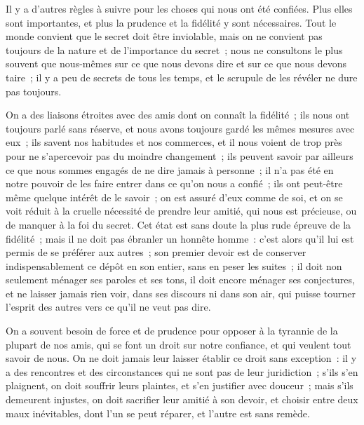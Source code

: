 \documentclass[french,twoside]{book} %
\begin{document}
Il y a d’autres règles à suivre pour les choses qui nous ont été confiées. Plus elles sont importantes, et plus la prudence et la fidélité y sont nécessaires. Tout le monde convient que le secret doit être inviolable, mais on ne convient pas toujours de la nature et de l’importance du secret ; nous ne consultons le plus souvent que nous-mêmes sur ce que nous devons dire et sur ce que nous devons taire ; il y a peu de secrets de tous les temps, et le scrupule de les révéler ne dure pas toujours.\par
On a des liaisons étroites avec des amis dont on connaît la fidélité ; ils nous ont toujours parlé sans réserve, et nous avons toujours gardé les mêmes mesures avec eux ; ils savent nos habitudes et nos commerces, et il nous voient de trop près pour ne s’apercevoir pas du moindre changement ; ils peuvent savoir par ailleurs ce que nous sommes engagés de ne dire jamais à personne ; il n’a pas été en notre pouvoir de les faire entrer dans ce qu’on nous a confié ; ils ont peut-être même quelque intérêt de le savoir ; on est assuré d’eux comme de soi, et on se voit réduit à la cruelle nécessité de prendre leur amitié, qui nous est précieuse, ou de manquer à la foi du secret. Cet état est sans doute la plus rude épreuve de la fidélité ; mais il ne doit pas ébranler un honnête homme : c’est alors qu’il lui est permis de se préférer aux autres ; son premier devoir est de conserver indispensablement ce dépôt en son entier, sans en peser les suites ; il doit non seulement ménager ses paroles et ses tons, il doit encore ménager ses conjectures, et ne laisser jamais rien voir, dans ses discours ni dans son air, qui puisse tourner l’esprit des autres vers ce qu’il ne veut pas dire.\par
On a souvent besoin de force et de prudence pour opposer à la tyrannie de la plupart de nos amis, qui se font un droit sur notre confiance, et qui veulent tout savoir de nous. On ne doit jamais leur laisser établir ce droit sans exception : il y a des rencontres et des circonstances qui ne sont pas de leur juridiction ; s’ils s’en plaignent, on doit souffrir leurs plaintes, et s’en justifier avec douceur ; mais s’ils demeurent injustes, on doit sacrifier leur amitié à son devoir, et choisir entre deux maux inévitables, dont l’un se peut réparer, et l’autre est sans remède.
\end{document}
